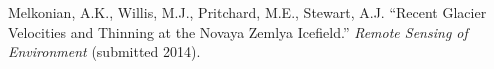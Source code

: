 

Melkonian, A.K., Willis, M.J., Pritchard, M.E., Stewart, A.J. ``Recent Glacier Velocities and Thinning at the Novaya Zemlya Icefield.'' \textit{Remote Sensing of Environment} (submitted 2014).
